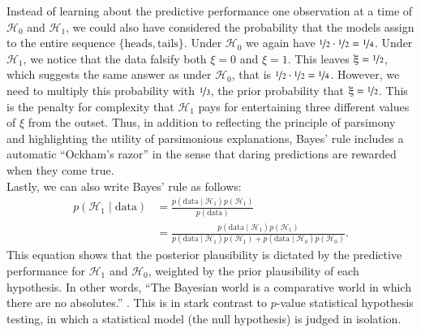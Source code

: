 \documentclass[man, floatsintext]{apa7} %
\begin{document}
Instead of learning about the predictive performance one observation at a time of $\mathcal{H}_0$ and $\mathcal{H}_1$, we could also have considered the probability that the models assign to the entire sequence $\{\text{heads}, \text{tails}\}$. Under $\mathcal{H}_0$ we again have $\nicefrac{1}{2} \cdot \nicefrac{1}{2} = \nicefrac{1}{4}$. Under $\mathcal{H}_1$, we notice that the data falsify both $\xi=0$ and $\xi=1$. This leaves $\xi=\nicefrac{1}{2}$, which suggests the same answer as under $\mathcal{H}_0$, that is $\nicefrac{1}{2} \cdot \nicefrac{1}{2} = \nicefrac{1}{4}$. However, we need to multiply this probability with $\nicefrac{1}{3}$, the prior probability that $\xi=\nicefrac{1}{2}$. This is the penalty for complexity that $\mathcal{H}_1$ pays for entertaining three different values of $\xi$ from the outset. Thus, in addition to reflecting the principle of parsimony and highlighting the utility of parsimonious explanations, Bayes' rule includes a automatic ``Ockham's razor'' \parencite{Jeffreys1939,JefferysBerger1992} in the sense that daring predictions are rewarded when they come true. \\
 
Lastly, we can also write Bayes' rule as follows:
\begin{equation}
\begin{split}
    p(\mathcal{H}_1 \mid \text{data})& = \frac{p(\text{data} \mid \mathcal{H}_1) p(\mathcal{H}_1)}{p(\text{data})}\\
    & = \frac{p(\text{data} \mid \mathcal{H}_1) p(\mathcal{H}_1)}{p(\text{data} \mid \mathcal{H}_1) p(\mathcal{H}_1) + p(\text{data} \mid \mathcal{H}_0) p(\mathcal{H}_0)}.
\end{split}
\end{equation}
This equation shows that the posterior plausibility is dictated by the predictive performance for $\mathcal{H}_1$ and $\mathcal{H}_0$, weighted by the prior plausibility of each hypothesis. In other words, ``The Bayesian world is a comparative world in which there are no absolutes.'' \parencite[p. 308]{Lindley2000}. This is in stark contrast to $p$-value statistical hypothesis testing, in which a statistical model (the null hypothesis) is judged in isolation. \\ 
\end{document}
